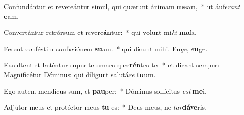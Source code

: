 \item Confundántur et revereántur simul, qui quærunt ánimam \textbf{me}am,~* ut áufe\textit{rant} \textbf{e}am.
\item Convertántur retrórsum et revere\textbf{án}tur:~* qui volunt mi\textit{hi} \textbf{ma}la.
\item Ferant conféstim confusiónem \textbf{su}am:~* qui dicunt mihi: Eu\textit{ge}, \textbf{eu}ge.
\item Exsúltent et læténtur super te omnes quæ\textbf{rén}tes te:~* et dicant semper: Magnificétur Dóminus: qui díligunt salutá\textit{re} \textbf{tu}um.
\item Ego autem mendícus sum, et \textbf{pau}per:~* Dóminus sollícitus \textit{est} \textbf{me}i.
\item Adjútor meus et protéctor meus \textbf{tu} es:~* Deus meus, ne \textit{tar}\textbf{dá}\textbf{ve}ris.
